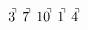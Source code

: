 \documentclass[preview]{standalone}
\begin{document}
\begin{align*}
3^{\hspace{-0.1cm}\urcorner} \ 7^{\hspace{-0.1cm}\urcorner} \ 10^{\hspace{-0.1cm}\urcorner} \ 1^{\hspace{-0.1cm}\urcorner} \ 4^{\hspace{-0.1cm}\urcorner}
\end{align*}
\end{document}
